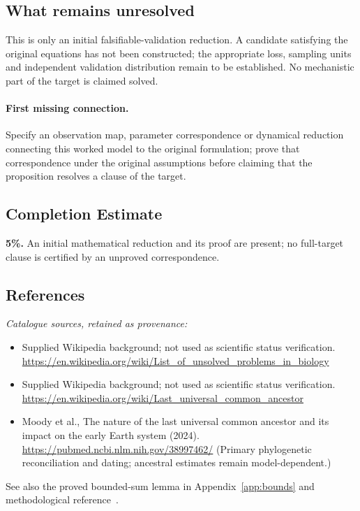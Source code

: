 \documentclass[11pt]{article}
\begin{document}
\subsection{What remains unresolved}
This is only an initial falsifiable-validation reduction. A candidate satisfying the original equations has not been constructed; the appropriate loss, sampling units and independent validation distribution remain to be established. No mechanistic part of the target is claimed solved.
\paragraph{First missing connection.} Specify an observation map, parameter correspondence or dynamical reduction connecting this worked model to the original formulation; prove that correspondence under the original assumptions before claiming that the proposition resolves a clause of the target.
\subsection{Completion Estimate}
\textbf{5\%.} An initial mathematical reduction and its proof are present; no full-target clause is certified by an unproved correspondence.
\subsection{References}
\noindent\emph{Catalogue sources, retained as provenance:}
\begin{itemize}
\item Supplied Wikipedia background; not used as scientific status verification. \url{https://en.wikipedia.org/wiki/List_of_unsolved_problems_in_biology}
\item Supplied Wikipedia background; not used as scientific status verification. \url{https://en.wikipedia.org/wiki/Last_universal_common_ancestor}
\item Moody et al., The nature of the last universal common ancestor and its impact on the early Earth system (2024). \url{https://pubmed.ncbi.nlm.nih.gov/38997462/} (Primary phylogenetic reconciliation and dating; ancestral estimates remain model-dependent.)
\end{itemize}
\noindent See also the proved bounded-sum lemma in Appendix~\ref{app:bounds} and methodological reference~\cite{hoeffding}.
\clearpage


\appendix
\end{document}
